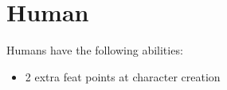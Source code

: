 \section{Human}\label{human}

Humans have the following abilities:
\begin{itemize}
    \item 2 extra feat points at character creation
\end{itemize}
